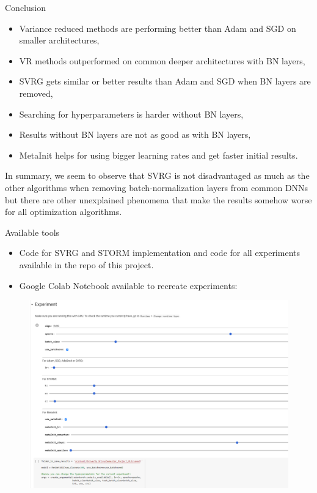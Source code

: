 \documentclass[10pt]{beamer}
\newcommand\pro{\item[\textbf{+}]}
\newcommand\con{\item[\textbf{--\kern 1.2pt}]}
\begin{document}
\begin{frame}{Conclusion}
    \begin{itemize}
        \pro Variance reduced methods are performing better than Adam and SGD on smaller architectures,
        \con VR methods outperformed on common deeper architectures with BN layers,
        \pro SVRG gets similar or better results than Adam and SGD when BN layers are removed,
        \con Searching for hyperparameters is harder without BN layers,
        \con Results without BN layers are not as good as with BN layers,
        \pro MetaInit helps for using bigger learning rates and get faster initial results.
        
    \end{itemize}
In summary, we seem to observe that SVRG is not disadvantaged as much as the other algorithms when removing batch-normalization layers from common DNNs but there are other unexplained phenomena that make the results somehow worse for all optimization algorithms.
\end{frame}

\begin{frame}{Available tools}
    \begin{itemize}
        \item Code for SVRG and STORM implementation and code for all experiments available in the repo of this project.
        \item Google Colab Notebook available to recreate experiments:
    \end{itemize}
    \begin{figure}
        \centering
        \includegraphics[width=.9\textwidth]{report/figures/ExampleExperiment.png}
    \end{figure}
\end{frame}
\end{document}
